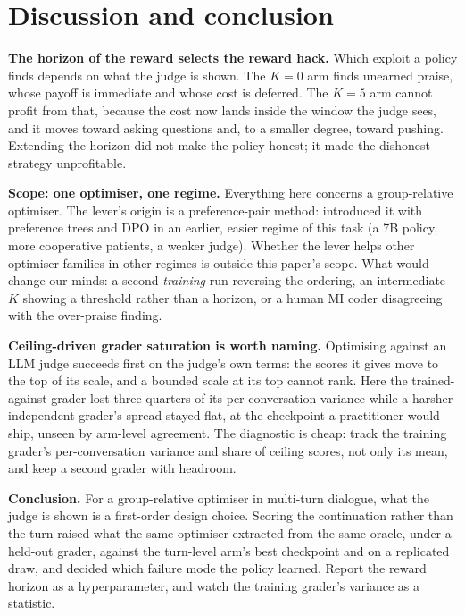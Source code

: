 \section{Discussion and conclusion}
\label{sec:discussion}

\textbf{The horizon of the reward selects the reward hack.} Which exploit a policy finds depends
on what the judge is shown. The $K{=}0$ arm finds unearned praise, whose payoff is immediate and
whose cost is deferred. The $K{=}5$ arm cannot profit from that, because
the cost now lands inside the window the judge sees, and it moves toward asking questions and, to
a smaller degree, toward pushing. Extending the horizon did not make the policy honest; it made
the dishonest strategy unprofitable.

\textbf{Scope: one optimiser, one regime.} Everything here concerns a group-relative optimiser.
The lever's origin is a preference-pair method: \citet{baruch2025pto} introduced it with
preference trees and DPO in an earlier, easier regime of this task (a 7B policy, more cooperative
patients, a weaker judge). Whether the lever helps other optimiser
families in other regimes is outside this paper's scope. What would change our minds: a second
\emph{training} run reversing the ordering, an intermediate $K$ showing a threshold rather than a
horizon, or a human MI coder disagreeing with the over-praise finding.

\textbf{Ceiling-driven grader saturation is worth naming.} Optimising against an LLM judge
succeeds first on the judge's own terms: the scores it gives move to the top of its scale, and a
bounded scale at its top cannot rank. Here the trained-against grader lost three-quarters of its
per-conversation variance while a harsher independent grader's spread stayed flat, at the
checkpoint a practitioner would ship, unseen by arm-level agreement. The diagnostic is
cheap: track the training grader's per-conversation variance and share of ceiling scores, not
only its mean, and keep a second grader with headroom.

\textbf{Conclusion.} For a group-relative optimiser in multi-turn dialogue, what the judge
is shown is a first-order design choice. Scoring the continuation rather than the turn raised what
the same optimiser extracted from the same oracle, under a held-out grader, against the turn-level
arm's best checkpoint and on a replicated draw, and decided which failure mode the policy
learned. Report the reward horizon as a hyperparameter, and watch the training grader's variance
as a statistic.
